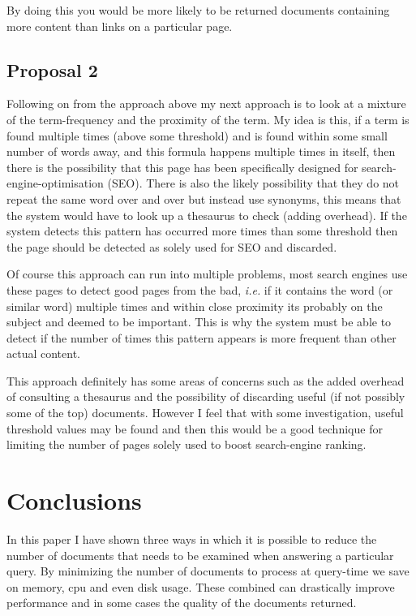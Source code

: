 \documentclass{acm_proc_article-sp}
\begin{document}
By doing this you would be more likely to be returned documents containing more content than links on a particular page.

\subsection{Proposal 2}

Following on from the approach above my next approach is to look at a mixture of the term-frequency and the proximity of the term. My idea is this, if a term is found multiple times (above some threshold) and is found within some small number of words away, and this formula happens multiple times in itself, then there is the possibility that this page has been specifically designed for search-engine-optimisation (SEO). There is also the likely possibility that they do not repeat the same word over and over but instead use synonyms, this means that the system would have to look up a thesaurus to check (adding overhead). If the system detects this pattern has occurred more times than some threshold then the page should be detected as solely used for SEO and discarded.

Of course this approach can run into multiple problems, most search engines use these pages to detect good pages from the bad, \emph{i.e.} if it contains the word (or similar word) multiple times and within close proximity its probably on the subject and deemed to be important. This is why the system must be able to detect if the number of times this pattern appears is more frequent than other actual content.

This approach definitely has some areas of concerns such as the added overhead of consulting a thesaurus and the possibility of discarding useful (if not possibly some of the top) documents. However I feel that with some investigation, useful threshold values may be found and then this would be a good technique for limiting the number of pages solely used to boost search-engine ranking.

\section{Conclusions}
In this paper I have shown three ways in which it is possible to reduce the number of documents that needs to be examined when answering a particular query. By minimizing the number of documents to process at query-time we save on memory, cpu and even disk usage. These combined can drastically improve performance and in some cases the quality of the documents returned. 
\end{document}

